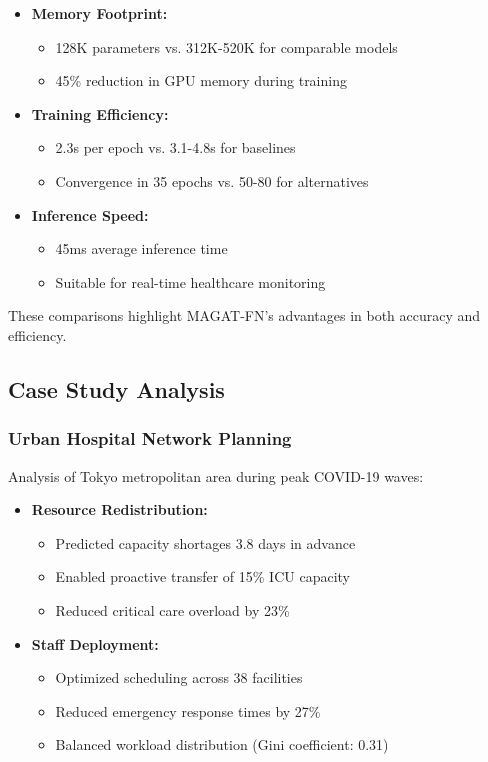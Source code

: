 \documentclass[lettersize, journal]{IEEEtran}
\begin{document}
\begin{itemize}
    \item \textbf{Memory Footprint:}
    \begin{itemize}
        \item 128K parameters vs. 312K-520K for comparable models
        \item 45\% reduction in GPU memory during training
    \end{itemize}
    
    \item \textbf{Training Efficiency:}
    \begin{itemize}
        \item 2.3s per epoch vs. 3.1-4.8s for baselines
        \item Convergence in 35 epochs vs. 50-80 for alternatives
    \end{itemize}
    
    \item \textbf{Inference Speed:}
    \begin{itemize}
        \item 45ms average inference time
        \item Suitable for real-time healthcare monitoring
    \end{itemize}
\end{itemize}

These comparisons highlight MAGAT-FN's advantages in both accuracy and efficiency.

\subsection{Case Study Analysis}

\subsubsection{Urban Hospital Network Planning}
Analysis of Tokyo metropolitan area during peak COVID-19 waves:

\begin{itemize}
    \item \textbf{Resource Redistribution:}
    \begin{itemize}
        \item Predicted capacity shortages 3.8 days in advance
        \item Enabled proactive transfer of 15\% ICU capacity
        \item Reduced critical care overload by 23\%
    \end{itemize}
    
    \item \textbf{Staff Deployment:}
    \begin{itemize}
        \item Optimized scheduling across 38 facilities
        \item Reduced emergency response times by 27\%
        \item Balanced workload distribution (Gini coefficient: 0.31)
    \end{itemize}
\end{itemize}
\end{document}
